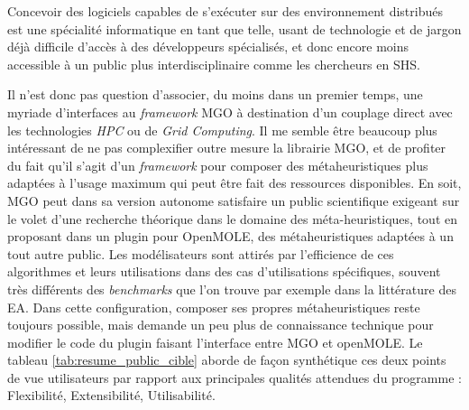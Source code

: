 Concevoir des logiciels capables de s'exécuter sur des environnement distribués est une spécialité informatique en tant que telle, usant de technologie et de jargon déjà difficile d'accès à des développeurs spécialisés, et donc encore moins accessible à un public plus interdisciplinaire comme les chercheurs en SHS.

Il n'est donc pas question d'associer, du moins dans un premier temps, une myriade d'interfaces au \textit{framework} MGO à destination d'un couplage direct avec les technologies \textit{HPC} ou de \textit{Grid Computing}. Il me semble être beaucoup plus intéressant de ne pas complexifier outre mesure la librairie MGO, et de profiter du fait qu'il s'agit d'un \textit{\textit{framework}} pour composer des métaheuristiques plus adaptées à l'usage maximum qui peut être fait des ressources disponibles. En soit, MGO peut dans sa version autonome satisfaire un public scientifique exigeant sur le volet d'une recherche théorique dans le domaine des méta-heuristiques, tout en proposant dans un plugin pour OpenMOLE, des métaheuristiques adaptées à un tout autre public. Les modélisateurs sont attirés par l'efficience de ces algorithmes et leurs utilisations dans des cas d'utilisations spécifiques, souvent très différents des \textit{benchmarks} que l'on trouve par exemple dans la littérature des EA. Dans cette configuration, composer ses propres métaheuristiques reste toujours possible, mais demande un peu plus de connaissance technique pour modifier le code du plugin faisant l'interface entre MGO et openMOLE. Le tableau \ref{tab:resume_public_cible} aborde de façon synthétique ces deux points de vue utilisateurs par rapport aux principales qualités attendues du programme : Flexibilité, Extensibilité, Utilisabilité.


